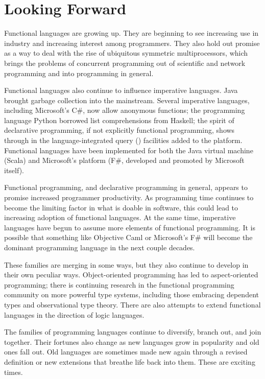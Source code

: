 \section*{Looking Forward}\label{conclusion:forward}
Functional languages are growing up. They are beginning to see increasing use in industry and increasing interest among programmers. They also hold out promise as a way to deal with the rise of ubiquitous symmetric multiprocessors, which brings the problems of concurrent programming out of scientific and network programming and into programming in general.

Functional languages also continue to influence imperative languages. Java brought garbage collection into the mainstream. Several imperative languages, including Microsoft's C\#, now allow anonymous functions; the programming language Python borrowed list comprehensions from Haskell; the spirit of declarative programming, if not explicitly functional programming, shows through in the language-integrated query () facilities added to the  platform. Functional languages have been implemented for both the Java virtual machine (Scala) and Microsoft's  platform (F\#, developed and promoted by Microsoft itself).

Functional programming, and declarative programming in general, appears to promise increased programmer productivity. As programming time continues to become the limiting factor in what is doable in software, this could lead to increasing adoption of functional languages. At the same time, imperative languages have begun to assume more elements of functional programming. It is possible that something like Objective Caml or Microsoft's F\# will become the dominant programming language in the next couple decades.

These families are merging in some ways, but they also continue to develop in their own peculiar ways. Object-oriented programming has led to aspect-oriented programming; there is continuing research in the functional programming community on more powerful type systems, including those embracing dependent types and observational type theory. There are also attempts to extend functional languages in the direction of logic languages.

The families of programming languages continue to diversify, branch out, and join together. Their fortunes also change as new languages grow in popularity and old ones fall out. Old languages are sometimes made new again through a revised definition or new extensions that breathe life back into them. These are exciting times.
